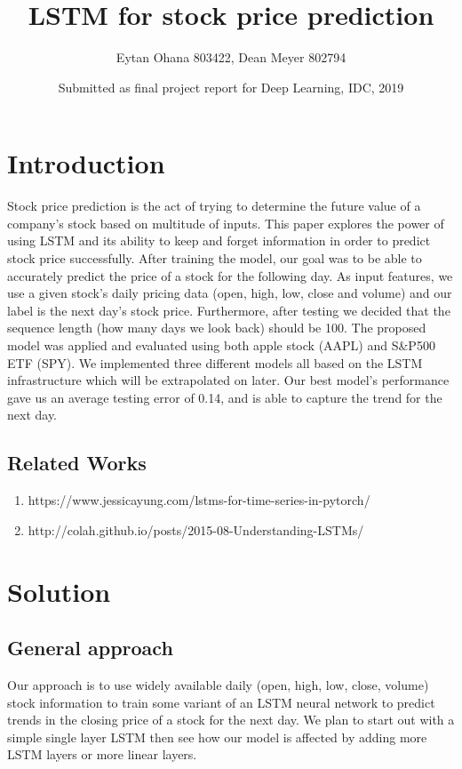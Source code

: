 \documentclass{article}
\title{LSTM for stock price prediction}
\author{Eytan Ohana 803422, Dean Meyer 802794}
\date{Submitted as final project report for Deep Learning, IDC, 2019}
\begin{document}
\maketitle

\section{Introduction}

Stock price prediction is the act of trying to determine the future value of a company’s stock based on multitude of inputs. This paper explores the power of using LSTM and its ability to keep and forget information in order to predict stock price successfully. After training the model, our goal was to be able to accurately predict the price of a stock for the following day. As input features, we use a given stock’s daily pricing data (open, high, low, close and volume) and our label is the next day’s stock price. Furthermore, after testing we decided that the sequence length (how many days we look back) should be 100. The proposed model was applied and evaluated using both apple stock (AAPL) and S\&P500 ETF (SPY). We implemented three different models all based on the LSTM infrastructure which will be extrapolated on later. Our best model’s performance gave us an average testing error of 0.14, and is able to capture the trend for the next day.

\subsection{Related Works}

\begin{enumerate}
    \item https://www.jessicayung.com/lstms-for-time-series-in-pytorch/
    \item http://colah.github.io/posts/2015-08-Understanding-LSTMs/
\end{enumerate}




\section{Solution}
\subsection{General approach}
Our approach is to use widely available daily (open, high, low, close, volume) stock information to train some variant of an LSTM neural network to predict trends in the closing price of a stock for the next day. We plan to start out with a simple single layer LSTM then see how our model is affected by adding more LSTM layers or more linear layers.
\end{document}
